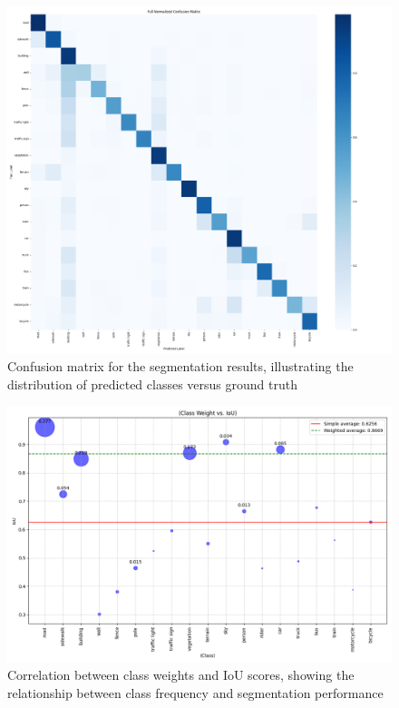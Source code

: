 \documentclass[]{article}
\begin{document}
\begin{figure}[htbp]
    \centering
    \includegraphics[width=1.0\textwidth]{../outputs/deeplabv3plus_test_results/full_confusion_matrix.png}
    \caption{Confusion matrix for the segmentation results, illustrating the distribution of predicted classes versus ground truth}
    \label{fig:confusion_matrix}
\end{figure}

\begin{figure}[htbp]
    \centering
    \includegraphics[width=1.0\textwidth]{../outputs/deeplabv3plus_test_results/class_weight_vs_iou.png}
    \caption{Correlation between class weights and IoU scores, showing the relationship between class frequency and segmentation performance}
    \label{fig:class_weight_vs_iou}
\end{figure}
\end{document}
